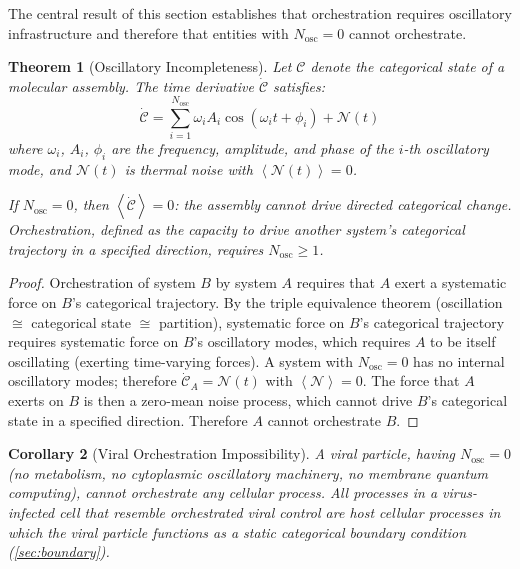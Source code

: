 \documentclass[11pt,twocolumn,a4paper]{article}
\newtheorem{theorem}{Theorem}[section]
\newtheorem{corollary}[theorem]{Corollary}
\theoremstyle{definition}
\theoremstyle{remark}
\newcommand{\Nosc}{N_{\mathrm{osc}}}
\newcommand{\avg}[1]{\left\langle #1 \right\rangle}
\begin{document}
The central result of this section establishes that orchestration requires oscillatory infrastructure and therefore that entities with $\Nosc = 0$ cannot orchestrate.

\begin{theorem}[Oscillatory Incompleteness]
\label{thm:OIT}
Let $\mathcal{C}$ denote the categorical state of a molecular assembly. The time derivative $\dot{\mathcal{C}}$ satisfies:
\begin{equation}
  \dot{\mathcal{C}} = \sum_{i=1}^{\Nosc} \omega_i A_i \cos(\omega_i t + \phi_i) + \mathcal{N}(t)
  \label{eq:Cdot}
\end{equation}
where $\omega_i$, $A_i$, $\phi_i$ are the frequency, amplitude, and phase of the $i$-th oscillatory mode, and $\mathcal{N}(t)$ is thermal noise with $\avg{\mathcal{N}(t)} = 0$.

If $\Nosc = 0$, then $\avg{\dot{\mathcal{C}}} = 0$: the assembly cannot drive directed categorical change. Orchestration, defined as the capacity to drive another system's categorical trajectory in a specified direction, requires $\Nosc \geq 1$.
\end{theorem}

\begin{proof}
Orchestration of system $B$ by system $A$ requires that $A$ exert a systematic force on $B$'s categorical trajectory. By the triple equivalence theorem (oscillation $\cong$ categorical state $\cong$ partition), systematic force on $B$'s categorical trajectory requires systematic force on $B$'s oscillatory modes, which requires $A$ to be itself oscillating (exerting time-varying forces). A system with $\Nosc = 0$ has no internal oscillatory modes; therefore $\dot{\mathcal{C}}_A = \mathcal{N}(t)$ with $\avg{\mathcal{N}} = 0$. The force that $A$ exerts on $B$ is then a zero-mean noise process, which cannot drive $B$'s categorical state in a specified direction. Therefore $A$ cannot orchestrate $B$.
\end{proof}

\begin{corollary}[Viral Orchestration Impossibility]
\label{cor:viral_impossibility}
A viral particle, having $\Nosc = 0$ (no metabolism, no cytoplasmic oscillatory machinery, no membrane quantum computing), cannot orchestrate any cellular process. All processes in a virus-infected cell that resemble orchestrated viral control are host cellular processes in which the viral particle functions as a static categorical boundary condition (\cref{sec:boundary}).
\end{corollary}
\end{document}
